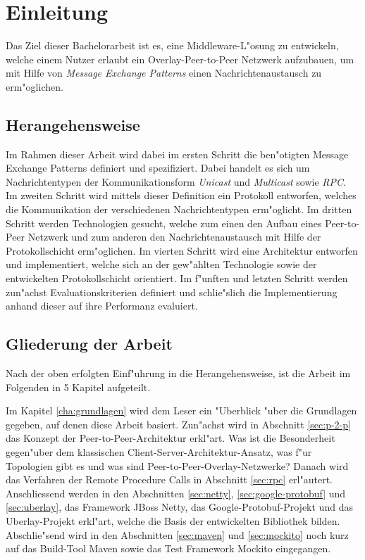 \chapter{Einleitung}
\label{cha:einleitung}

Das Ziel dieser Bachelorarbeit ist es, eine Middleware-L"osung zu entwickeln, welche einem Nutzer erlaubt ein Overlay-Peer-to-Peer Netzwerk aufzubauen, um mit Hilfe von \emph{Message Exchange Patterns} einen Nachrichtenaustausch zu erm"oglichen.

\section{Herangehensweise}

Im Rahmen dieser Arbeit wird dabei im ersten Schritt die ben"otigten Message Exchange Patterns definiert und spezifiziert. Dabei handelt es sich um Nachrichtentypen der Kommunikationsform \emph{Unicast} und \emph{Multicast} sowie \emph{RPC}. Im zweiten Schritt wird mittels dieser Definition ein Protokoll entworfen, welches die Kommunikation der verschiedenen Nachrichtentypen erm"oglicht. Im dritten Schritt werden Technologien gesucht, welche zum einen den Aufbau eines Peer-to-Peer Netzwerk und zum anderen den Nachrichtenaustausch mit Hilfe der Protokollschicht erm"oglichen. Im vierten Schritt wird eine Architektur entworfen und implementiert, welche sich an der gew"ahlten Technologie sowie der entwickelten Protokollschicht orientiert. Im f"unften und letzten Schritt werden zun"achst Evaluationskriterien definiert und schlie"slich die Implementierung anhand dieser auf ihre Performanz evaluiert. 

\section{Gliederung der Arbeit}
Nach der oben erfolgten Einf"uhrung in die Herangehensweise, ist die Arbeit im Folgenden in 5 Kapitel aufgeteilt.

Im Kapitel \ref{cha:grundlagen} wird dem Leser ein "Uberblick "uber die Grundlagen gegeben, auf denen diese Arbeit basiert. Zun"achst wird in Abschnitt \ref{sec:p-2-p} das Konzept der Peer-to-Peer-Architektur erkl"art. Was ist die Besonderheit gegen"uber dem klassischen Client-Server-Architektur-Ansatz, was f"ur Topologien gibt es und was sind Peer-to-Peer-Overlay-Netzwerke? Danach wird das Verfahren der Remote Procedure Calls in Abschnitt \ref{sec:rpc} erl"autert. Anschliessend werden in den Abschnitten \ref{sec:netty}, \ref{sec:google-protobuf} und \ref{sec:uberlay}, das Framework JBoss Netty, das Google-Protobuf-Projekt und das Uberlay-Projekt erkl"art, welche die Basis der entwickelten Bibliothek bilden. Abschlie"send wird in den Abschnitten \ref{sec:maven} und \ref{sec:mockito} noch kurz auf das Build-Tool Maven sowie das Test Framework Mockito eingegangen.

